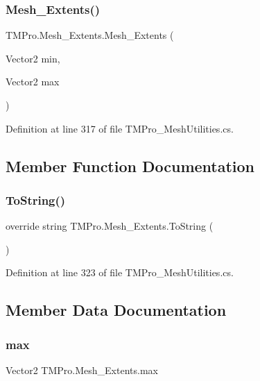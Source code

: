 \subsubsection{\texorpdfstring{Mesh\_Extents()}{Mesh\_Extents()}}
{\footnotesize\ttfamily T\+M\+Pro.\+Mesh\+\_\+\+Extents.\+Mesh\+\_\+\+Extents (\begin{DoxyParamCaption}\item[{Vector2}]{min,  }\item[{Vector2}]{max }\end{DoxyParamCaption})}



Definition at line 317 of file T\+M\+Pro\+\_\+\+Mesh\+Utilities.\+cs.



\subsection{Member Function Documentation}
\mbox{\label{struct_t_m_pro_1_1_mesh___extents_ae2f5e6bc1c18cc8bb0bde6b68636c8c0}} 
\subsubsection{\texorpdfstring{ToString()}{ToString()}}
{\footnotesize\ttfamily override string T\+M\+Pro.\+Mesh\+\_\+\+Extents.\+To\+String (\begin{DoxyParamCaption}{ }\end{DoxyParamCaption})}



Definition at line 323 of file T\+M\+Pro\+\_\+\+Mesh\+Utilities.\+cs.



\subsection{Member Data Documentation}
\mbox{\label{struct_t_m_pro_1_1_mesh___extents_a5607321d47ef5cc849062aa196dfc10e}} 
\subsubsection{\texorpdfstring{max}{max}}
{\footnotesize\ttfamily Vector2 T\+M\+Pro.\+Mesh\+\_\+\+Extents.\+max}



